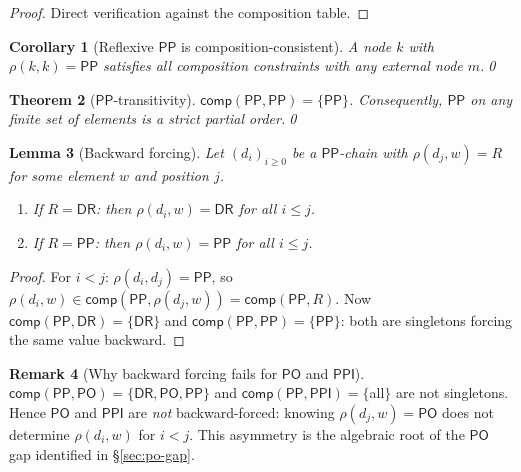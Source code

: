 \documentclass[a4paper,11pt]{article}
\newtheorem{theorem}{Theorem}[section]
\newtheorem{lemma}[theorem]{Lemma}
\newtheorem{corollary}[theorem]{Corollary}
\theoremstyle{definition}
\newtheorem{remark}[theorem]{Remark}
\newcommand{\DR}{\ensuremath{\mathsf{DR}}}
\newcommand{\PO}{\ensuremath{\mathsf{PO}}}
\newcommand{\PP}{\ensuremath{\mathsf{PP}}}
\newcommand{\PPI}{\ensuremath{\mathsf{PPI}}}
\newcommand{\comp}{\ensuremath{\mathsf{comp}}}
\begin{document}
\begin{proof}
Direct verification against the composition table.
\end{proof}

\begin{corollary}[Reflexive $\PP$ is composition-consistent]
\label{cor:reflexive-pp}
A node $k$ with $\rho(k,k) = \PP$ satisfies all composition
constraints with any external node $m$.\qed
\end{corollary}

\begin{theorem}[$\PP$-transitivity]
\label{thm:no-pp-cycle}
$\comp(\PP, \PP) = \{\PP\}$.  Consequently, $\PP$ on any finite set
of elements is a strict partial order.\qed
\end{theorem}

\begin{lemma}[Backward forcing]\label{lem:backward}
Let $(d_i)_{i \ge 0}$ be a $\PP$-chain with $\rho(d_j, w) = R$ for
some element $w$ and position $j$.
\begin{enumerate}[label=(\alph*)]
\item If $R = \DR$: then $\rho(d_i, w) = \DR$ for all $i \le j$.
\item If $R = \PP$: then $\rho(d_i, w) = \PP$ for all $i \le j$.
\end{enumerate}
\end{lemma}

\begin{proof}
For $i < j$: $\rho(d_i, d_j) = \PP$, so
$\rho(d_i, w) \in \comp(\PP, \rho(d_j, w)) = \comp(\PP, R)$.
Now $\comp(\PP, \DR) = \{\DR\}$ and $\comp(\PP, \PP) = \{\PP\}$:
both are singletons forcing the same value backward.
\end{proof}

\begin{remark}[Why backward forcing fails for $\PO$ and $\PPI$]
\label{rem:no-backward-po}
$\comp(\PP, \PO) = \{\DR, \PO, \PP\}$ and
$\comp(\PP, \PPI) = \{$all$\}$ are not singletons.  Hence
$\PO$ and $\PPI$ are \emph{not} backward-forced: knowing
$\rho(d_j, w) = \PO$ does not determine $\rho(d_i, w)$ for
$i < j$.  This asymmetry is the algebraic root of the $\PO$ gap
identified in \S\ref{sec:po-gap}.
\end{remark}
\end{document}
